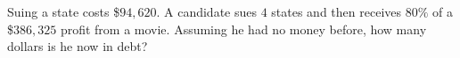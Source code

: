 Suing a state costs \$$94{,}620$. A candidate sues $4$ states and then receives $80\%$ of a \$$386{,}325$ profit from a movie. Assuming he had no money before, how many dollars is he now in debt?

